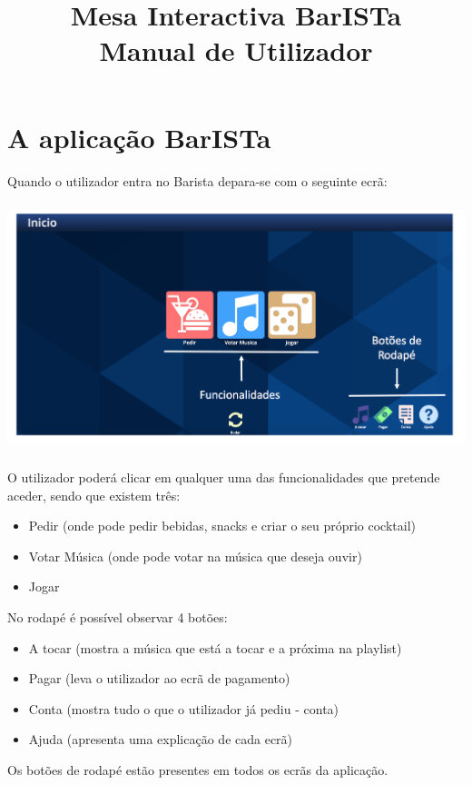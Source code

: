 \documentclass{article}
\title{\vspace{5cm}\textbf{Mesa Interactiva BarISTa}\\Manual de Utilizador}
\begin{document}
\maketitle
\newpage

\tableofcontents
\newpage

\section{A aplicação BarISTa}
Quando o utilizador entra no Barista depara-se com o seguinte ecrã:\\
\includegraphics[width=15cm, height=8cm]{user_manual_images/chick.png}
O utilizador poderá clicar em qualquer uma das funcionalidades que pretende aceder, sendo que existem três:
\begin{itemize} 
\item Pedir (onde pode pedir bebidas, snacks e criar o seu próprio cocktail)
\item Votar Música  (onde pode votar na música que deseja ouvir)
\item Jogar 
\end{itemize}
No rodapé é possível observar 4 botões:
\begin{itemize} 
\item A tocar (mostra a música que está a tocar e a próxima na playlist)
\item Pagar   (leva o utilizador ao ecrã de pagamento)
\item Conta   (mostra tudo o que o utilizador já pediu - conta)
\item Ajuda   (apresenta uma explicação de cada ecrã)
\end{itemize}
Os botões de rodapé estão presentes em todos os ecrãs da aplicação.
\end{document}
